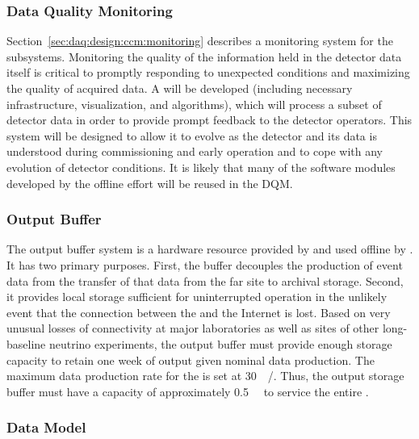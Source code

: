\subsubsection{Data Quality Monitoring}
\label{sec:fd-daq:design-data-quality}

Section~\ref{sec:daq:design:ccm:monitoring} describes a monitoring system for the  subsystems. 
Monitoring the quality of the information held in the detector data itself is critical to promptly responding to unexpected conditions and maximizing the quality of acquired data. 
A   
will be developed (including necessary infrastructure, visualization,
and algorithms), which will process a subset of detector data in order
to provide prompt feedback to the detector operators. 
This system will be designed to allow it to evolve as the detector and its data is understood during commissioning and early operation and to cope with any evolution of detector conditions.
It is likely that many of the software modules developed by the
offline effort will be reused in the DQM.

\subsubsection{Output Buffer}


The output buffer system is a hardware resource provided by  and used offline by . 
It has two primary purposes. 
First, the buffer decouples the production of event data from the transfer of that data from the far site to archival storage.
Second, it provides local storage sufficient for uninterrupted  operation in the unlikely event that the connection between the  and the Internet is lost. 
Based on very unusual losses of connectivity at major laboratories as well as  sites of other long-baseline neutrino experiments, the output buffer must provide enough storage capacity to retain one week of output given nominal data production. 
The maximum data production rate for the  is set at \SI{30}{\peta\byte/\year}. 
Thus, the output storage buffer must have a capacity of approximately \SI{0.5}{\peta\byte} to service the entire .

\subsubsection{Data Model}
\label{sec:fd-daq:design-data-model}

